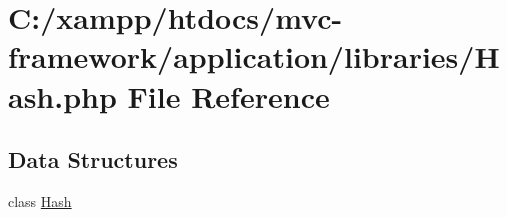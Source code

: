\hypertarget{_hash_8php}{}\section{C\+:/xampp/htdocs/mvc-\/framework/application/libraries/\+Hash.php File Reference}
\label{_hash_8php}
\subsection*{Data Structures}
\begin{DoxyCompactItemize}
\item 
class \hyperlink{class_hash}{Hash}
\end{DoxyCompactItemize}
